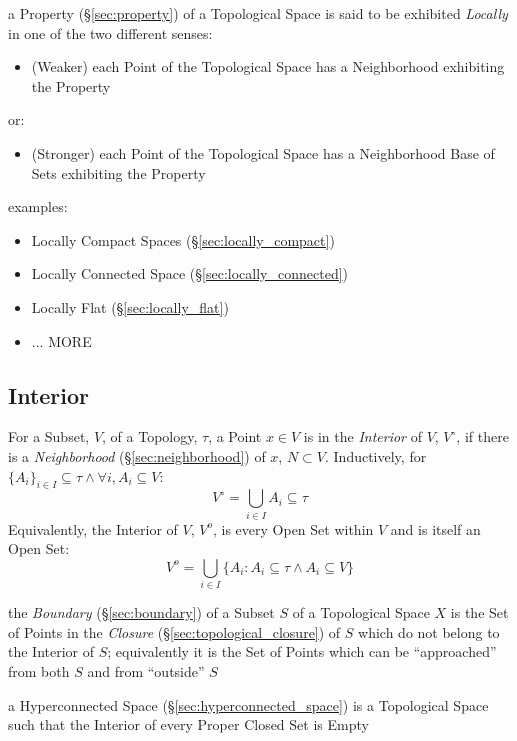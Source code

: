 a Property (\S\ref{sec:property}) of a Topological Space is said to be exhibited
\emph{Locally} in one of the two different senses:
\begin{itemize}
  \item (Weaker) each Point of the Topological Space has a Neighborhood
    exhibiting the Property
\end{itemize}
or:
\begin{itemize}
  \item (Stronger) each Point of the Topological Space has a Neighborhood Base
    of Sets exhibiting the Property
\end{itemize}

examples:
\begin{itemize}
  \item Locally Compact Spaces (\S\ref{sec:locally_compact})
  \item Locally Connected Space (\S\ref{sec:locally_connected})
  \item Locally Flat (\S\ref{sec:locally_flat})
  \item ... MORE
\end{itemize}



\subsection{Interior}\label{sec:interior}

For a Subset, $V$, of a Topology, $\tau$, a Point $x \in V$ is in the
\emph{Interior} of $V$, $V^{\circ}$, if there is a \emph{Neighborhood}
(\S\ref{sec:neighborhood}) of $x$, $N \subset V$. Inductively, for
$\{A_i\}_{i \in I} \subseteq \tau \wedge \forall i, A_i \subseteq V$:
\[
  V^{\circ} = \bigcup_{i \in I} A_i \subseteq \tau
\]
Equivalently, the Interior of $V$, $V^o$, is every Open Set within $V$
and is itself an Open Set:
\[
  V^o = \bigcup_{i \in I} \{ A_i : A_i \subseteq \tau \wedge A_i
  \subseteq V \}
\]

\fist the \emph{Boundary} (\S\ref{sec:boundary}) of a Subset $S$ of a
Topological Space $X$ is the Set of Points in the \emph{Closure}
(\S\ref{sec:topological_closure}) of $S$ which do not belong to the
Interior of $S$; equivalently it is the Set of Points which can be
``approached'' from both $S$ and from ``outside'' $S$

\fist a Hyperconnected Space (\S\ref{sec:hyperconnected_space}) is a
Topological Space such that the Interior of every Proper
Closed Set is Empty



